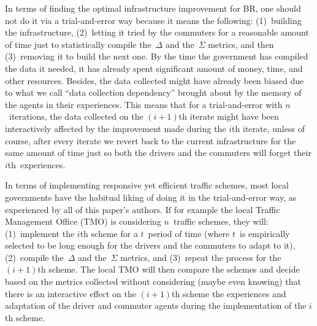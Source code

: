 \documentclass[preprint]{./acm_proc_article-sp}
\begin{document}
In terms of finding the optimal infrastructure improvement for BR, one should not do it via a trial-and-error way because it means the following: (1)~building the infrastructure, (2)~letting it tried by the commuters for a reasonable amount of time just to statistically compile the~$\Delta$ and the~$\Sigma$ metrics, and then (3)~removing it to build the next one. By the time the government has compiled the data it needed, it has already spent significant amount of money, time, and other resources. Besides, the data collected might have already been biased due to what we call ``data collection dependency'' brought about by the memory of the agents in their experiences. This means that for a trial-and-error with $n$~iterations, the data collected on the $(i+1)$th iterate might have been interactively affected by the improvement made during the $i$th iterate, unless of course, after every iterate we revert back to the current infrastructure for the same amount of time just so both the drivers and the commuters will forget their $i$th~experiences. 

In terms of implementing responsive yet efficient traffic schemes, most local governments have the habitual liking of doing it in the trial-and-error way, as experienced by all of this paper's authors. If for example the local Traffic Management Office (TMO) is considering $n$~traffic schemes, they will: (1)~implement the $i$th scheme for a $t$~period of time (where $t$~is empirically selected to be long enough for the drivers and the commuters to adapt to it), (2)~compile the~$\Delta$ and the~$\Sigma$ metrics, and (3)~repeat the process for the $(i+1)$th scheme. The local TMO will then compare the schemes and decide based on the metrics collected without considering (maybe even knowing) that there is an interactive effect on the $(i+1)$th scheme the experiences and adaptation of the driver and commuter agents during the implementation of the $i$th scheme.
\end{document}
